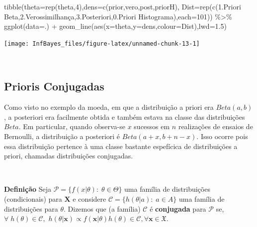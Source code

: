 \documentclass[
]{book}
\newenvironment{Shaded}{\begin{snugshade}}{\end{snugshade}}
\newcommand{\AttributeTok}[1]{\textcolor[rgb]{0.77,0.63,0.00}{#1}}
\newcommand{\DecValTok}[1]{\textcolor[rgb]{0.00,0.00,0.81}{#1}}
\newcommand{\FloatTok}[1]{\textcolor[rgb]{0.00,0.00,0.81}{#1}}
\newcommand{\FunctionTok}[1]{\textcolor[rgb]{0.00,0.00,0.00}{#1}}
\newcommand{\NormalTok}[1]{#1}
\newcommand{\SpecialCharTok}[1]{\textcolor[rgb]{0.00,0.00,0.00}{#1}}
\newcommand{\StringTok}[1]{\textcolor[rgb]{0.31,0.60,0.02}{#1}}
\begin{document}
\begin{Shaded}
\begin{Highlighting}[]
\FunctionTok{tibble}\NormalTok{(}\AttributeTok{theta=}\FunctionTok{rep}\NormalTok{(theta,}\DecValTok{4}\NormalTok{),}\AttributeTok{dens=}\FunctionTok{c}\NormalTok{(prior,vero,post,priorH),}
    \AttributeTok{Dist=}\FunctionTok{rep}\NormalTok{(}\FunctionTok{c}\NormalTok{(}\StringTok{\textquotesingle{}1.Priori Beta\textquotesingle{}}\NormalTok{,}\StringTok{\textquotesingle{}2.Verossimilhança\textquotesingle{}}\NormalTok{,}\StringTok{\textquotesingle{}3.Posteriori\textquotesingle{}}\NormalTok{,}\StringTok{\textquotesingle{}0.Priori Histograma\textquotesingle{}}\NormalTok{),}\AttributeTok{each=}\DecValTok{101}\NormalTok{)) }\SpecialCharTok{\%\textgreater{}\%} 
  \FunctionTok{ggplot}\NormalTok{(}\AttributeTok{data=}\NormalTok{.) }\SpecialCharTok{+}
  \FunctionTok{geom\_line}\NormalTok{(}\FunctionTok{aes}\NormalTok{(}\AttributeTok{x=}\NormalTok{theta,}\AttributeTok{y=}\NormalTok{dens,}\AttributeTok{colour=}\NormalTok{Dist),}\AttributeTok{lwd=}\FloatTok{1.5}\NormalTok{)}
\end{Highlighting}
\end{Shaded}

\begin{center}\texttt{[image: InfBayes\_files/figure-latex/unnamed-chunk-13-1]} \end{center}

\(~\)

\hypertarget{prioris-conjugadas}{%
\subsection{Prioris Conjugadas}\label{prioris-conjugadas}}

Como visto no exemplo da moeda, em que a distribuição a priori era \(Beta(a,b)\), a posteriori era facilmente obtida e também estava na classe das distribuições \(Beta\). Em particular, quando observa-se \(x\) sucessos em \(n\) realizações de ensaios de Bernoulli, a distribuição a posteriori é \(Beta(a+x,b+n-x)\). Isso ocorre pois essa distribuição pertence à uma classe bastante espefícica de distribuições a priori, chamadas distribuições conjugadas.

\(~\)

\textbf{Definição} Seja \(\mathcal{P}=\{f(x|\theta):\;\theta \in \Theta\}\) uma família de distribuições (condicionais) para \(\boldsymbol{X}\) e considere \(\mathcal{C}=\{h(\theta|a):\;a\in A\}\) uma família de distribuições para \(\theta\). Dizemos que (a família) \(\mathcal{C}\) é \textbf{conjugada} para \(\mathcal{P}\) se, \(\forall \;h(\theta)\in \mathcal{C},\) \(h(\theta|\boldsymbol{x})\propto f(\boldsymbol x|\theta)h(\theta) \in \mathcal{C},\forall \boldsymbol x \in \mathfrak{X}.\)
\end{document}
